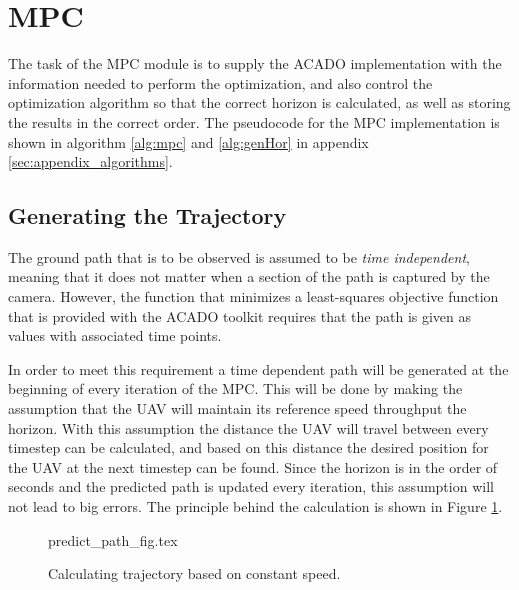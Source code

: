 \section{MPC}

The task of the MPC module is to supply the ACADO implementation with the information needed to perform the optimization, and also control the optimization algorithm so that the correct horizon is calculated, as well as storing the results in the correct order. The pseudocode for the MPC implementation is shown in algorithm \ref{alg:mpc} and \ref{alg:genHor} in appendix \ref{sec:appendix_algorithms}.


\subsection{Generating the Trajectory}

The ground path that is to be observed is assumed to be \textit{time independent}, meaning that it does not matter when a section of the path is captured by the camera. However, the function that minimizes a least-squares objective function that is provided with the ACADO toolkit requires that the path is given as values with associated time points.

In order to meet this requirement a time dependent path will be generated at the beginning of every iteration of the MPC. This will be done by making the assumption that the UAV will maintain its reference speed throughput the horizon. With this assumption the distance the UAV will travel between every timestep can be calculated, and based on this distance the desired position for the UAV at the next timestep can be found. Since the horizon is in the order of seconds and the predicted path is updated every iteration, this assumption will not lead to big errors. The principle behind the calculation is shown in Figure \ref{fig:predict_path}.

\begin{figure}
	{predict_path_fig.tex}
	\caption{Calculating trajectory based on constant speed.}
	\label{fig:predict_path}
\end{figure}